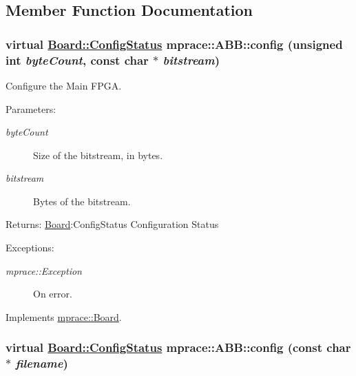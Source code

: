 \subsection{Member Function Documentation}
\hypertarget{classmprace_1_1ABB_a14}{
\subsubsection[config]{\setlength{\rightskip}{0pt plus 5cm}virtual \hyperlink{classmprace_1_1Board_w4}{Board::Config\-Status} mprace::ABB::config (unsigned int {\em byte\-Count}, const char $\ast$ {\em bitstream})}}
\label{classmprace_1_1ABB_a14}


Configure the Main FPGA. 

\begin{Desc}
\item[Parameters:]
\begin{description}
\item[{\em byte\-Count}]Size of the bitstream, in bytes. \item[{\em bitstream}]Bytes of the bitstream. \end{description}
\end{Desc}
\begin{Desc}
\item[Returns:]\hyperlink{classmprace_1_1Board}{Board}:Config\-Status Configuration Status \end{Desc}
\begin{Desc}
\item[Exceptions:]
\begin{description}
\item[{\em mprace::Exception}]On error.\end{description}
\end{Desc}


Implements \hyperlink{classmprace_1_1Board_a15}{mprace::Board}.\hypertarget{classmprace_1_1ABB_a13}{
\subsubsection[config]{\setlength{\rightskip}{0pt plus 5cm}virtual \hyperlink{classmprace_1_1Board_w4}{Board::Config\-Status} mprace::ABB::config (const char $\ast$ {\em filename})}}
\label{classmprace_1_1ABB_a13}


